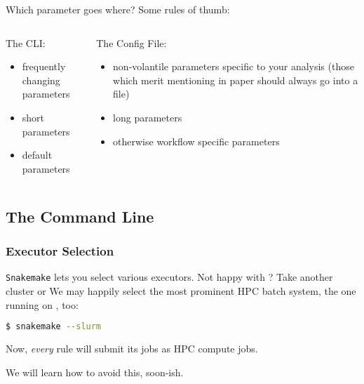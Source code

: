 \begin{frame}
  \pause
  \begin{exampleblock}{Which parameter goes where? Some rules of thumb:}
    \begin{columns}[t]
      \begin{column}{0.5\textwidth}
        The CLI:
        \begin{itemize}
         \item frequently changing parameters
         \item short parameters
         \item default parameters
        \end{itemize}
      \end{column}
      \begin{column}{0.5\textwidth}
        The Config File:
        \begin{itemize}
         \item non-volantile parameters specific to your analysis (those which merit mentioning in paper should always go into a file)
         \item long parameters
         \item otherwise workflow specific parameters
        \end{itemize}
      \end{column}
    \end{columns}
  \end{exampleblock}
\end{frame}


\subsection{The Command Line}

\begin{frame}[fragile]
  \frametitle{Executor Selection}
  \texttt{Snakemake} lets you select various executors. Not happy with \mogon? Take another cluster or  \newline
  We may happily select the most prominent HPC batch system, the one running on \mogon, too:
  \begin{lstlisting}[language=Bash, style=Shell]
$ snakemake --slurm
  \end{lstlisting}
  Now, \emph{every} rule will submit its jobs as HPC compute jobs.
  \begin{hint}
  	We will learn how to avoid this, soon-ish.
  \end{hint}
\end{frame}

